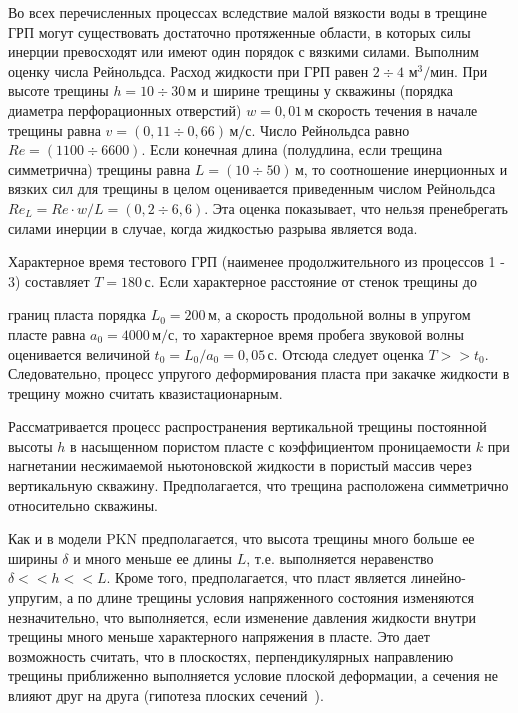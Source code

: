 Во всех перечисленных процессах вследствие малой вязкости воды в трещине ГРП могут существовать достаточно протяженные области, в которых силы инерции превосходят или имеют один порядок с вязкими силами. Выполним оценку числа Рейнольдса. Расход жидкости при ГРП равен $2 \div 4$ $\text{м}^3/\text{мин}$. При высоте трещины $h = 10 \div 30\, \text{м}$ и ширине трещины у скважины (порядка диаметра перфорационных отверстий) $w = 0,01 \, \text{м}$ скорость течения в начале трещины равна $v =(0,11 \div 0,66)\, \text{м}/\text{с}$. Число Рейнольдса равно  $Re =(1100 \div 6600)$. Если конечная длина (полудлина, если трещина симметрична) трещины равна $L =(10 \div 50)\, \text{м}$, то соотношение инерционных и вязких сил для трещины в целом оценивается приведенным числом Рейнольдса $Re_L =Re \cdot w/L=(0,2 \div 6,6)$. Эта оценка показывает, что нельзя пренебрегать силами инерции в случае, когда жидкостью разрыва является вода.

	

Характерное время тестового ГРП (наименее продолжительного из процессов 1 - 3) составляет $T =180\, \text{с}$. Если характерное расстояние от стенок трещины до 

границ пласта порядка $L_0 = 200 \, \text{м}$, а скорость продольной волны в упругом пласте равна $a_0 = 4000\, \text{м}/\text{с}$, то характерное время пробега звуковой волны оценивается величиной $t_0 = L_0/a_0 = 0,05 \, \text{с}$. Отсюда следует оценка $T>> t_0$. Следовательно, процесс упругого деформирования пласта при закачке жидкости в трещину можно считать квазистационарным.




Рассматривается процесс распространения вертикальной трещины постоянной высоты $h$ в насыщенном пористом пласте с коэффициентом проницаемости $k$ при нагнетании несжимаемой ньютоновской жидкости в пористый массив через вертикальную скважину. Предполагается, что трещина расположена симметрично относительно скважины.



Как и в модели PKN предполагается, что высота трещины много больше ее ширины $\delta$ и много меньше ее длины $L$, т.е. выполняется неравенство $\delta << h << L$. Кроме того, предполагается, что пласт является линейно-упругим, а по длине трещины условия напряженного состояния изменяются незначительно, что выполняется, если изменение давления жидкости внутри трещины много меньше характерного напряжения в пласте. Это дает возможность считать, что в плоскостях, перпендикулярных направлению трещины приближенно выполняется условие плоской деформации, а сечения не влияют друг на друга (гипотеза плоских сечений~\cite{Perkins_Kern, Nordgren1}).



